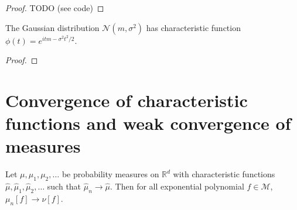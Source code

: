 \begin{proof}
\leanok
TODO (see code)
\end{proof}




\begin{lemma}\label{lem:gaussian_charFun}
\leanok
{}
The Gaussian distribution $\mathcal N(m, \sigma^2)$ has characteristic function $\phi(t) = e^{itm - \sigma^2 t^2 /2}$.
\end{lemma}

\begin{proof}\leanok
\end{proof}



\section{Convergence of characteristic functions and weak convergence of measures}


\begin{lemma}\label{lem:tendsto_M_of_tendsto_charFun}
\leanok
{}
Let $\mu, \mu_1, \mu_2, \ldots$ be probability measures on $\mathbb{R}^d$ with characteristic functions $\hat{\mu}, \hat{\mu}_1, \hat{\mu}_2, \ldots$ such that $\hat{\mu}_n \to \hat{\mu}$.
Then for all exponential polynomial $f \in \mathcal M$, $\mu_n[f] \to \nu[f]$.
\end{lemma}

